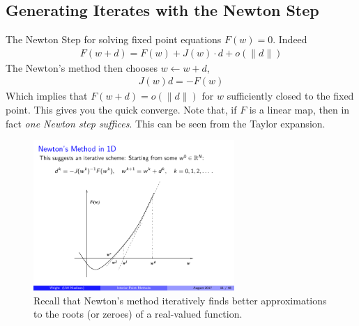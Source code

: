 \subsection{Generating Iterates with the Newton Step}
	The Newton Step for solving fixed point equations $F(w) = 0$. Indeed
	\begin{eqnarray*}
	F(w+d) = F(w) + J(w)\cdot d + o(\|d\|)
	\end{eqnarray*}
	The Newton's method then chooses $w \leftarrow w + d$,
	\begin{eqnarray*}
	J(w)d = - F(w)
	\end{eqnarray*}
	Which implies that $F(w+d) = o(\|d\|)$ for $w$ sufficiently closed to the fixed point. This gives you the quick converge. Note that, if $F$ is a linear map, then in fact \emph{one Newton step suffices}. This can be seen from the Taylor expansion. 

\begin{figure}
\begin{center}
\includegraphics[width=3in]{figures/lecture26-newton}
\end{center}
\caption{ Recall that Newton's method iteratively finds better approximations to the roots (or zeroes) of a real-valued function.}
\end{figure}

